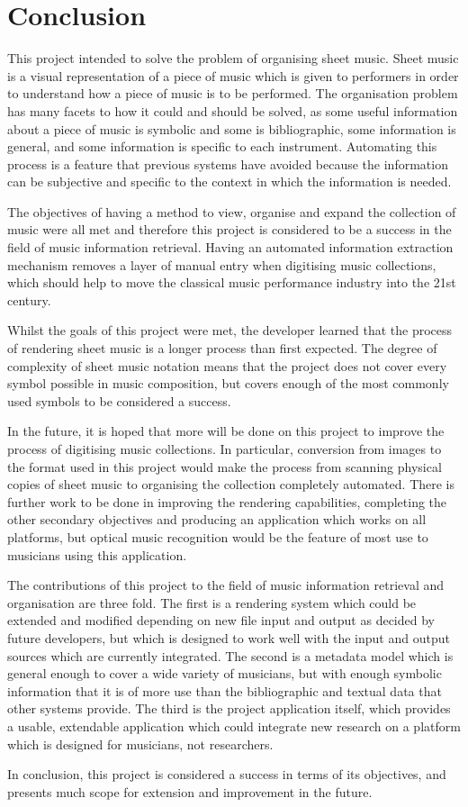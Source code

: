 \section{Conclusion}
This project intended to solve the problem of organising sheet music. Sheet music is a visual representation of a piece of music which is given to performers in order to understand how a piece of music is to be performed. The organisation problem has many facets to how it could and should be solved, as some useful information about a piece of music is symbolic and some is bibliographic, some information is general, and some information is specific to each instrument. Automating this process is a feature that previous systems have avoided because the information can be subjective and specific to the context in which the information is needed.

The objectives of having a method to view, organise and expand the collection of music were all met and therefore this project is considered to be a success in the field of music information retrieval. Having an automated information extraction mechanism removes a layer of manual entry when digitising music collections, which should help to move the classical music performance industry into the 21st century. 

Whilst the goals of this project were met, the developer learned that the process of rendering sheet music is a longer process than first expected. The degree of complexity of sheet music notation means that the project does not cover every symbol possible in music composition, but covers enough of the most commonly used symbols to be considered a success.

In the future, it is hoped that more will be done on this project to improve the process of digitising music collections. In particular, conversion from images to the format used in this project would make the process from scanning physical copies of sheet music to organising the collection completely automated. There is further work to be done in improving the rendering capabilities, completing the other secondary objectives and producing an application which works on all platforms, but optical music recognition would be the feature of most use to musicians using this application.


The contributions of this project to the field of music information retrieval and organisation are three fold. The first is a rendering system which could be extended and modified depending on new file input and output as decided by future developers, but which is designed to work well with the input and output sources which are currently integrated. The second is a metadata model which is general enough to cover a wide variety of musicians, but with enough symbolic information that it is of more use than the bibliographic and textual data that other systems provide. The third is the project application itself, which provides a usable, extendable application which could integrate new research on a platform which is designed for musicians, not researchers.

In conclusion, this project is considered a success in terms of its objectives, and presents much scope for extension and improvement in the future.
